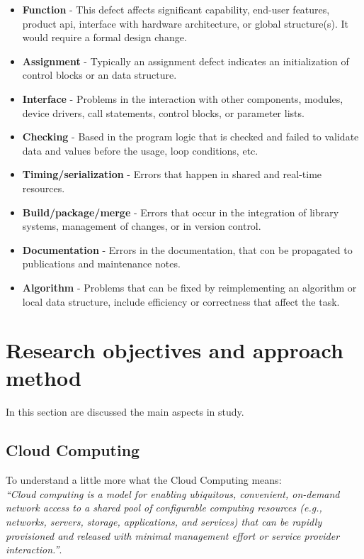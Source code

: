 \begin{itemize}
	\item \textbf{Function} - This defect affects significant capability, end-user features, product \ac{api}, interface with hardware architecture, or global structure(s). It would require a formal design change.
	\item \textbf{Assignment} - Typically an assignment defect indicates an initialization of control blocks or an data structure.
	\item \textbf{Interface} - Problems in the interaction with other components, modules, device drivers, call statements, control blocks, or parameter lists.
	\item \textbf{Checking} - Based in the program logic that is checked and failed to validate data and values before the usage, loop conditions, etc.
	\item \textbf{Timing/serialization} - Errors that happen in shared and real-time resources.
	\item \textbf{Build/package/merge} - Errors that occur in the integration of library systems, management of changes, or in version control.
	\item \textbf{Documentation} - Errors in the documentation, that con be propagated to publications and maintenance notes.
	\item \textbf{Algorithm} - Problems that can be fixed by reimplementing an algorithm or local data structure, include efficiency or correctness that affect the task.
\end{itemize}


\newpage
\section{Research objectives and approach method}

In this section are discussed the main aspects in study.

\subsection{Cloud Computing}



To understand a little more what the Cloud Computing means:\\

\textit{``Cloud computing is a model for enabling ubiquitous, convenient, on-demand network access to a shared pool of configurable computing resources (e.g., networks, servers, storage, applications, and services) that can be rapidly provisioned and released with minimal management effort or service provider interaction.''}\cite{mell2011nist}.\\

